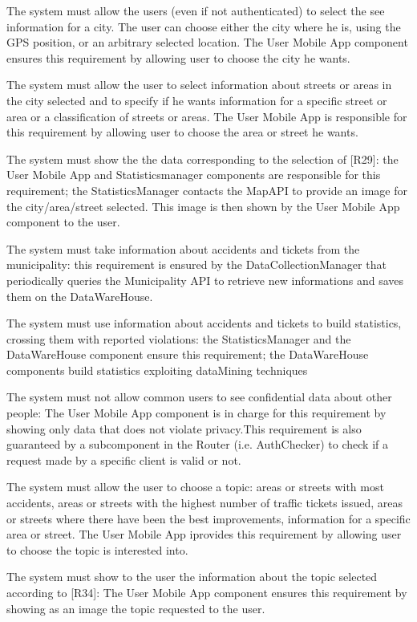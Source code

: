 \documentclass[a4paper]{report}
\begin{document}
\begin{enumerate}[start=1,label={[R\arabic*]}]
\item The system must allow the users (even if not authenticated) to select the see information for a city. The user can choose either the city where he is, using the GPS position, or an arbitrary selected location. The User Mobile App component ensures this requirement by allowing user to choose the city he wants.
\item The system must allow the user to select information about streets or areas in the city selected and to specify if he wants information for a specific street or area or a classification of streets or areas. The User Mobile App is responsible for this requirement by allowing user to choose the area or street he wants.
\item The system must show the the data corresponding to the selection of [R29]: the User Mobile App and Statisticsmanager components are responsible for this requirement; the StatisticsManager contacts the MapAPI to provide an image for the city/area/street selected. This image is then shown by the User Mobile App component to the user.
\item The system must take information about accidents and tickets from the municipality: this requirement is ensured by the DataCollectionManager that periodically queries the Municipality API to retrieve new informations and saves them on the DataWareHouse.
\item The system must use information  about accidents and tickets to build statistics, crossing them with reported violations: the StatisticsManager and the DataWareHouse component ensure this requirement; the DataWareHouse components build statistics exploiting dataMining techniques
\item The system must not allow common users to see confidential data about other people: The User Mobile App component is in charge for this requirement by showing only data that does not violate privacy.This requirement is also guaranteed by a subcomponent in the Router (i.e. AuthChecker) to check if a request made by a specific client is valid or not.
\item The system must allow the user to choose a topic: areas or streets with most accidents, areas or streets with the highest number of traffic tickets issued, areas or streets where there have been the best improvements, information for a specific area or street. The User Mobile App iprovides this requirement by allowing user to choose the topic is interested into.
\item The system must show to the user the information about the topic selected according to [R34]: The User Mobile App component ensures this requirement by showing as an image the topic requested to the user.

\end{enumerate}
\end{document}
